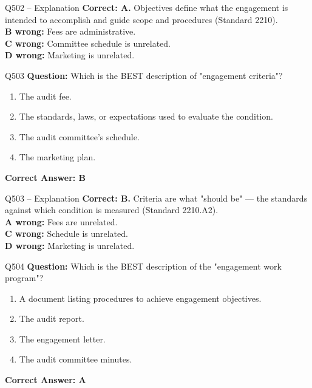 \documentclass[aspectratio=169,10pt]{beamer}
\begin{document}
	\begin{frame}[t]{Q502 -- Explanation}
		\small
		\textbf{Correct: A.} Objectives define what the engagement is intended to accomplish and guide scope and procedures (Standard 2210). \\[4pt]
		\textbf{B wrong:} Fees are administrative. \\[2pt]
		\textbf{C wrong:} Committee schedule is unrelated. \\[2pt]
		\textbf{D wrong:} Marketing is unrelated.
	\end{frame}
	
	\begin{frame}[t]{Q503}
		\small
		\textbf{Question:} Which is the BEST description of "engagement criteria"?
		\begin{enumerate}[label=\Alph*.,itemsep=1pt,topsep=2pt]
			\item The audit fee.
			\item The standards, laws, or expectations used to evaluate the condition.
			\item The audit committee's schedule.
			\item The marketing plan.
		\end{enumerate}
		\vspace{4pt}
		\textbf{Correct Answer: B}
	\end{frame}
	
	\begin{frame}[t]{Q503 -- Explanation}
		\small
		\textbf{Correct: B.} Criteria are what "should be" — the standards against which condition is measured (Standard 2210.A2). \\[4pt]
		\textbf{A wrong:} Fees are unrelated. \\[2pt]
		\textbf{C wrong:} Schedule is unrelated. \\[2pt]
		\textbf{D wrong:} Marketing is unrelated.
	\end{frame}
	
	\begin{frame}[t]{Q504}
		\small
		\textbf{Question:} Which is the BEST description of the "engagement work program"?
		\begin{enumerate}[label=\Alph*.,itemsep=1pt,topsep=2pt]
			\item A document listing procedures to achieve engagement objectives.
			\item The audit report.
			\item The engagement letter.
			\item The audit committee minutes.
		\end{enumerate}
		\vspace{4pt}
		\textbf{Correct Answer: A}
	\end{frame}
	
\end{document}
